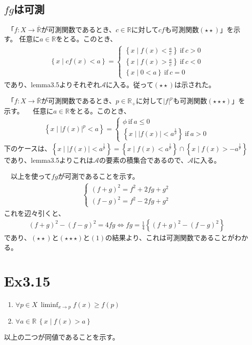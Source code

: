 \documentclass{article}
\begin{document}
　\subsection{$fg$は可測}
　「$f:X\to \bar{\mathbb{R}}$が可測関数であるとき、$c \in \mathbb{R}$に対して$cf$も可測関数$(\star \star)$」を示す。
	任意に$a\in \mathbb{R}$をとる。このとき、
\begin{align*}
	\left\{ x\mid cf(x) < a \right\} = \begin{cases}
	\left\{ x\mid f(x) < \frac{a}{c} \right\} \ \text{if}\ c > 0\\[8pt]
	\left\{ x\mid f(x) > \frac{a}{c} \right\} \ \text{if}\ c < 0\\[8pt]
	\left\{ x\mid 0 < a \right\} \ \text{if}\ c = 0
	\end{cases}
\end{align*}
であり、lemma3.5よりそれぞれ$\mathcal{A}$に入る。従って$(\star \star)$は示された。

　「$f:X\to \bar{\mathbb{R}}$が可測関数であるとき、$p \in \mathbb{R}_{+}$に対して${|f|}^p$も可測関数$(\star \star \star)$」を示す。
　任意に$a\in \mathbb{R}$をとる。このとき、
\begin{align*}
	\left\{ x\mid {|f(x)|}^p < a \right\} = \begin{cases}
	\phi\ \text{if}\ a \leq 0\\[8pt]
	\left\{ x\mid |f(x)| < a^{\frac{1}{p}} \right\}\ \text{if}\ a > 0
	\end{cases}
\end{align*}
下のケースは、$\left\{ x\mid |f(x)| < a^{\frac{1}{p}} \right\} = \left\{ x\mid f(x) < a^{\frac{1}{p}} \right\} \cap \left\{ x\mid f(x) > -a^{\frac{1}{p}} \right\}$であり、lemma3.5よりこれは$\mathcal{A}$の要素の積集合であるので、$\mathcal{A}$に入る。

　以上を使って$fg$が可測であることを示す。
\begin{align*}
	\begin{cases}
	{(f + g)}^2 = f^2 + 2fg + g^2\\
	{(f - g)}^2 = f^2 -2fg + g^2
	\end{cases}
\end{align*}
これを辺々引くと、
\begin{align*}
	{(f + g)}^2 - {(f - g)}^2 = 4fg \Leftrightarrow fg = \frac{1}{4} \left\{ {(f + g)}^2 - {(f - g)}^2 \right\}
\end{align*}
であり、$(\star \star)$と$(\star \star \star)$と$(1)$の結果より、これは可測関数であることがわかる。

\section{Ex3.15}
\begin{enumerate}
	\item $\forall p \in X\ \liminf_{x\to p} f(x) \geq f(p)$ 
	\item $\forall a\in \mathbb{R}\ \left\{ x\mid f(x) >a\right\}$
\end{enumerate}
以上の二つが同値であることを示す。
\end{document}
